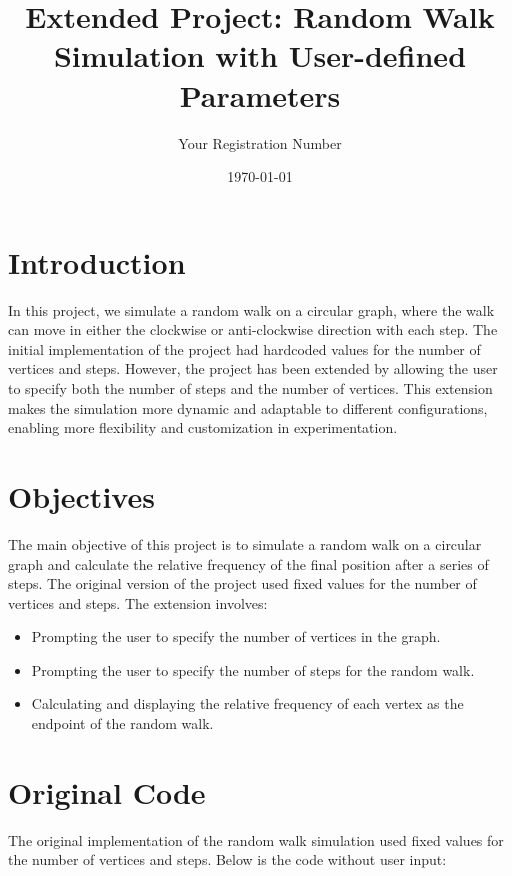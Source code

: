 \documentclass[a4paper,12pt]{amsart}
\title{Extended Project: Random Walk Simulation with User-defined Parameters}
\author{Your Registration Number}
\date{\today}
\begin{document}
\maketitle

\section{Introduction}
In this project, we simulate a random walk on a circular graph, where the walk can move in either the clockwise or anti-clockwise direction with each step. The initial implementation of the project had hardcoded values for the number of vertices and steps. However, the project has been extended by allowing the user to specify both the number of steps and the number of vertices. This extension makes the simulation more dynamic and adaptable to different configurations, enabling more flexibility and customization in experimentation.

\section{Objectives}
The main objective of this project is to simulate a random walk on a circular graph and calculate the relative frequency of the final position after a series of steps. The original version of the project used fixed values for the number of vertices and steps. The extension involves:
\begin{itemize}
  \item Prompting the user to specify the number of vertices in the graph.
  \item Prompting the user to specify the number of steps for the random walk.
  \item Calculating and displaying the relative frequency of each vertex as the endpoint of the random walk.
\end{itemize}

\section{Original Code}
The original implementation of the random walk simulation used fixed values for the number of vertices and steps. Below is the code without user input:
\end{document}
